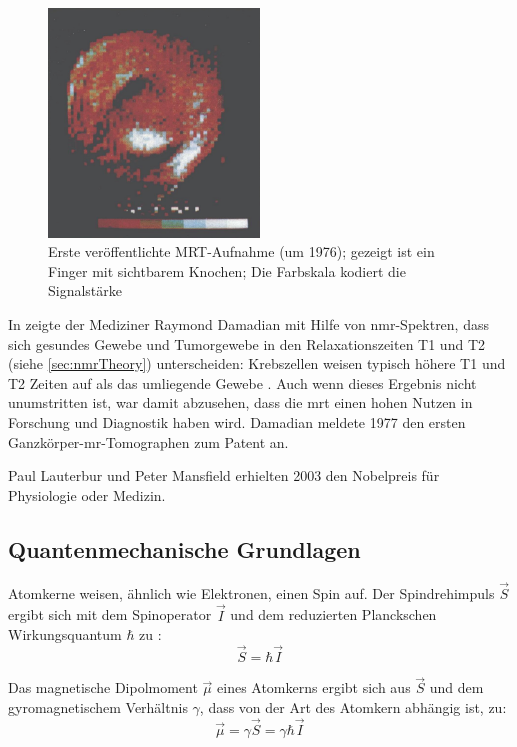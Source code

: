 \begin{figure}[H]
	\centering
	\includegraphics[width=0.5\textwidth]{img/ext/mansfieldFinger.png}
	\caption[Erste MRT-Aufnahme von Mansfield]{Erste veröffentlichte MRT-Aufnahme (um 1976); gezeigt ist ein Finger mit sichtbarem Knochen; Die Farbskala kodiert die Signalstärke \cite{Mansfield1977a}}
	\label{fig:mansfieldFinger}
\end{figure}

In \cite{Damadian1971} zeigte der Mediziner Raymond Damadian mit Hilfe von \gls{nmr}-Spektren, dass sich gesundes Gewebe und Tumorgewebe in den Relaxationszeiten T1 und T2 (siehe \autoref{sec:nmrTheory}) unterscheiden: Krebszellen weisen typisch höhere T1 und T2 Zeiten auf als das umliegende Gewebe \cite{Damadian1971}. Auch wenn dieses Ergebnis nicht unumstritten ist, war damit abzusehen, dass die \gls{mrt} einen hohen Nutzen in Forschung und Diagnostik haben wird. Damadian meldete 1977 den ersten Ganzkörper-\gls{mr}-Tomographen zum Patent an.

Paul Lauterbur und Peter Mansfield erhielten 2003 den Nobelpreis für Physiologie oder Medizin.

\subsection{Quantenmechanische Grundlagen}
\label{sec:nmrTheory}
Atomkerne weisen, ähnlich wie Elektronen, einen Spin auf. Der Spindrehimpuls $\vec{S}$ ergibt sich mit dem Spinoperator $\vec{I}$ und dem reduzierten Planckschen Wirkungsquantum $\hbar$ zu \cite[S.~55]{Nishimura1996}:
\begin{equation}
	\vec{S}=\hbar \vec{I}
\end{equation}

Das magnetische Dipolmoment $\vec{\mu}$ eines Atomkerns ergibt sich aus $\vec{S}$ und dem gyromagnetischem Verhältnis $\gamma$, dass von der Art des Atomkern abhängig ist, zu:
\begin{equation}
	\vec{\mu}=\gamma \vec{S} = \gamma \hbar \vec{I}
\end{equation}

